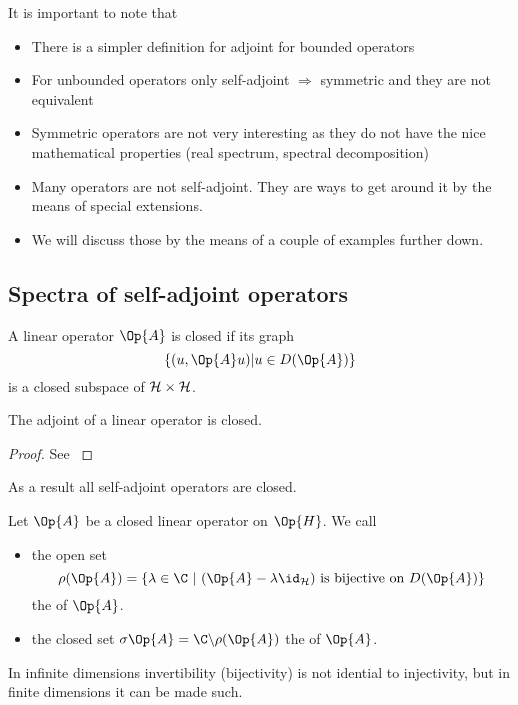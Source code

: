 It is important to note that
\begin{itemize}
	\item There is a simpler definition for adjoint for bounded operators
	\item For unbounded operators only self-adjoint $\Rightarrow$ symmetric
		and they are not equivalent
	\item Symmetric operators are not very interesting
		as they do not have the nice mathematical properties (real spectrum, spectral decomposition)
	\item Many \QM operators are not self-adjoint.
		They are ways to get around it by the means of special extensions.
	\item We will discuss those by the means of a couple of examples
		further down.
\end{itemize}

\subsection{Spectra of self-adjoint operators}
\begin{defn}
	A linear operator $\Op{A}$ is closed if its graph
	\[ \{ (u, \Op{A}u) | u \in D(\Op{A}) \} \]
	is a closed subspace of $\mathcal{H} \times \mathcal{H}$.
\end{defn}

\begin{prop}
	The adjoint of a linear operator is closed.
	\begin{proof}
		See \cite[p. 17]{Helffer2013}
	\end{proof}
\end{prop}
As a result all self-adjoint operators are closed.

\newcommand{\shiftop}{(\Op{A} - \lambda \id_{\hilbert})}
\begin{defn}
	Let $\Op{A}$ be a closed linear operator on $\Op{H}$.
	We call
	\begin{itemize}
		\item the open set
			\[ \rho(\Op{A}) = \left\{ \lambda \in \C \ \middle| \
				\shiftop \
				\text{is bijective on $D(\Op{A})$} \right\} \]
			the  of $\Op{A}$.
		\item the closed set $\sigma{\Op{A}} = \C \backslash \rho(\Op{A})$
			the \newterm{spectrum} of $\Op{A}$.
	\end{itemize}
\end{defn}
In infinite dimensions invertibility (bijectivity) is not idential to injectivity,
but in finite dimensions it can be made such.

